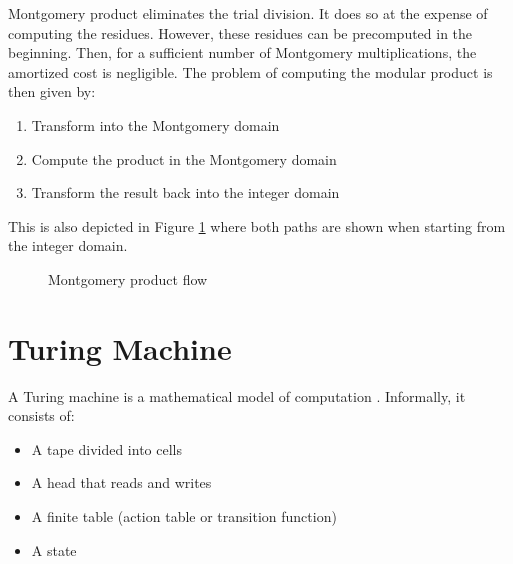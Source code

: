 \begin{algorithm}
  \begin{algorithmic}
      \State \Return {}
    \EndFunction
  \end{algorithmic}
\end{algorithm}

Montgomery product eliminates the trial division. It does so at the
expense of computing the residues. However, these residues can be
precomputed in the beginning. Then, for a sufficient number of
Montgomery multiplications, the amortized cost is negligible. The
problem of computing the modular product is then given by:
\begin{enumerate}
\item Transform into the Montgomery domain
\item Compute the product in the Montgomery domain
\item Transform the result back into the integer domain
\end{enumerate}
This is also depicted in Figure \ref{fig:montpro_flow} where both paths
are shown when starting from the integer domain.

\begin{figure}[hbt!]
  \centering
  \caption{Montgomery product flow}
  \label{fig:montpro_flow}
\end{figure}

\filbreak

\section{Turing Machine}

A Turing machine is a mathematical model of computation \cite{Turing}.
Informally, it consists of:
\begin{itemize}
\item A tape divided into cells
\item A head that reads and writes
\item A finite table (action table or transition function)
\item A state
\end{itemize}

